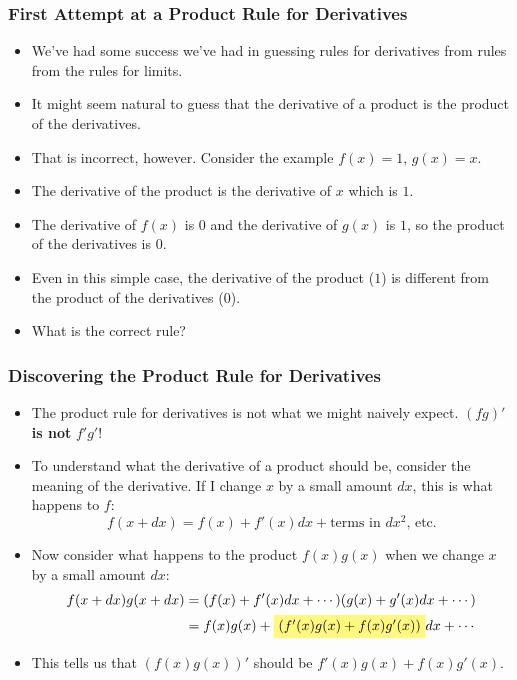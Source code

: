 \documentclass[serif,ignorenonframetext]{beamer}
\begin{document}
\begin{frame}
  \frametitle{First Attempt at a Product Rule for Derivatives}
  \begin{itemize}[<+->]
  \item We've had some success we've had in guessing rules for derivatives
    from rules from the rules for limits.
  \item It might seem natural to guess that the derivative of a product is
    the product of the derivatives.
  \item That is incorrect, however.  Consider the example $f(x)=1$, $g(x)=x$.
  \item The derivative of the product is the derivative of $x$ which is $1$.
  \item The derivative of $f(x)$ is $0$ and the derivative of $g(x)$ is $1$,
    so the product of the derivatives is $0$.
  \item Even in this simple case, the derivative of the product ($1$) is
    different from the product of the derivatives ($0$).
  \item What is the correct rule?
  \end{itemize}
\end{frame}

\begin{frame}
  \frametitle{Discovering the Product Rule for Derivatives}
  \begin{itemize}[<+->]
  \item The product rule for derivatives is not what we might
    naively expect. 
    $(fg)'$ \textbf{is not} $f'g'$!
  \item To understand what the derivative of a product should be,
    consider the meaning of the derivative.  If I change $x$ by
    a small amount $dx$, this is what happens to $f$:
    \begin{displaymath}
      f(x+dx) = f(x) + f'(x) dx + \mbox{terms in $dx^2$, etc.}
    \end{displaymath}
  \item Now consider what happens to the product $f(x)g(x)$
    when we change $x$ by a small amount $dx$:
    \begin{align*}
      f(x+dx)g(x+dx) &= (f(x)+f'(x)dx+\cdots)(g(x)+g'(x)dx+\cdots) \\
      &= f(x)g(x) + 
      \tikz[baseline=(t1.base)]{
        \node[fill=yellow!50] (t1)
	{$(f'(x)g(x)+f(x)g'(x))$};
      }
      dx + \cdots
    \end{align*}
  \item This tells us that $(f(x)g(x))'$ should be $f'(x)g(x)+f(x)g'(x)$.
  \end{itemize}
\end{frame}
\end{document}
